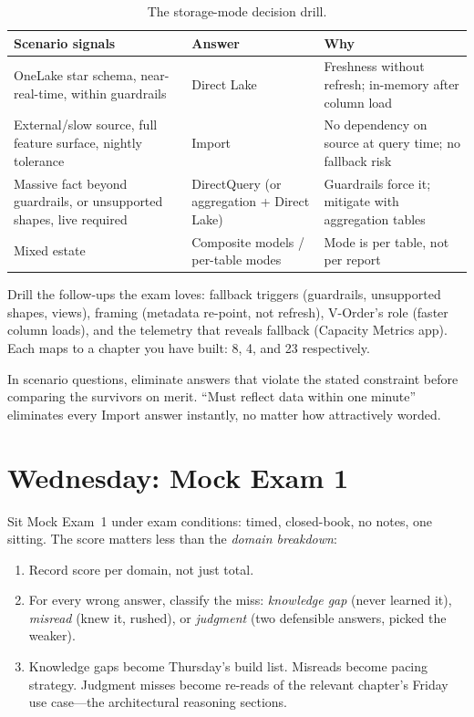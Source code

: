 \begin{table}[H]
\centering
\small
\begin{tabular}{@{}p{4.6cm}p{4.6cm}p{4.6cm}@{}}
\toprule
\textbf{Scenario signals} & \textbf{Answer} & \textbf{Why} \\
\midrule
OneLake star schema, near-real-time, within guardrails & Direct Lake & Freshness without refresh; in-memory after column load \\
External/slow source, full feature surface, nightly tolerance & Import & No dependency on source at query time; no fallback risk \\
Massive fact beyond guardrails, or unsupported shapes, live required & DirectQuery (or aggregation + Direct Lake) & Guardrails force it; mitigate with aggregation tables \\
Mixed estate & Composite models / per-table modes & Mode is per table, not per report \\
\bottomrule
\end{tabular}
\caption{The storage-mode decision drill.}
\label{tab:chapter24-storage-drill}
\end{table}

Drill the follow-ups the exam loves: fallback triggers (guardrails, unsupported shapes, views), framing (metadata re-point, not refresh), V-Order's role (faster column loads), and the telemetry that reveals fallback (Capacity Metrics app). Each maps to a chapter you have built: 8, 4, and 23 respectively.

\begin{tipbox}
In scenario questions, eliminate answers that violate the stated constraint before comparing the survivors on merit. ``Must reflect data within one minute'' eliminates every Import answer instantly, no matter how attractively worded.
\end{tipbox}

\section{Wednesday: Mock Exam 1}
Sit Mock Exam~1 under exam conditions: timed, closed-book, no notes, one sitting. The score matters less than the \emph{domain breakdown}:

\begin{enumerate}
    \item Record score per domain, not just total.
    \item For every wrong answer, classify the miss: \emph{knowledge gap} (never learned it), \emph{misread} (knew it, rushed), or \emph{judgment} (two defensible answers, picked the weaker).
    \item Knowledge gaps become Thursday's build list. Misreads become pacing strategy. Judgment misses become re-reads of the relevant chapter's Friday use case---the architectural reasoning sections.
\end{enumerate}


